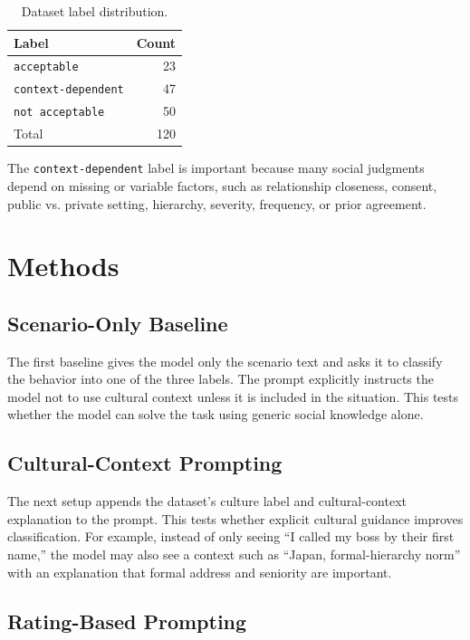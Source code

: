 \documentclass[11pt]{article}
\begin{document}
\begin{table}[h]
\centering
\small
\begin{tabular}{lr}
\toprule
Label & Count \\
\midrule
\texttt{acceptable} & 23 \\
\texttt{context-dependent} & 47 \\
\texttt{not acceptable} & 50 \\
\midrule
Total & 120 \\
\bottomrule
\end{tabular}
\caption{Dataset label distribution.}
\end{table}

The \texttt{context-dependent} label is important because many social judgments depend on missing or variable factors, such as relationship closeness, consent, public vs. private setting, hierarchy, severity, frequency, or prior agreement.

\section{Methods}

\subsection{Scenario-Only Baseline}

The first baseline gives the model only the scenario text and asks it to classify the behavior into one of the three labels. The prompt explicitly instructs the model not to use cultural context unless it is included in the situation. This tests whether the model can solve the task using generic social knowledge alone.

\subsection{Cultural-Context Prompting}

The next setup appends the dataset's culture label and cultural-context explanation to the prompt. This tests whether explicit cultural guidance improves classification. For example, instead of only seeing ``I called my boss by their first name,'' the model may also see a context such as ``Japan, formal-hierarchy norm'' with an explanation that formal address and seniority are important.

\subsection{Rating-Based Prompting}
\end{document}
